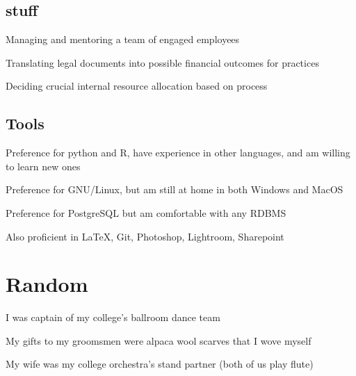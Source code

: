 \documentclass[]{deedy-resume-openfont}
\begin{document}
\begin{minipage}[t]{0.66\textwidth}
\subsection{stuff}
\vspace{\topsep} %
\begin{tightemize}
	\item Managing and mentoring a team of engaged employees
	\item Translating legal documents into possible financial outcomes for practices
	\item Deciding crucial internal resource allocation based on process
\end{tightemize}
\subsection{Tools}
\vspace{\topsep} %
\begin{tightemize}
\item Preference for python and R, have experience in other languages, and am willing to learn new ones
\item Preference for GNU/Linux, but am still at home in both Windows and MacOS
\item Preference for PostgreSQL but am comfortable with any RDBMS
\item Also proficient in \LaTeX, Git, Photoshop, Lightroom, Sharepoint
\end{tightemize}

\section{Random}
\vspace{\topsep} %
\begin{tightemize}
\item I was captain of my college's ballroom dance team
\item My gifts to my groomsmen were alpaca wool scarves that I wove myself
\item My wife was my college orchestra's stand partner (both of us play flute)
\end{tightemize}




\end{minipage}
\end{document}
